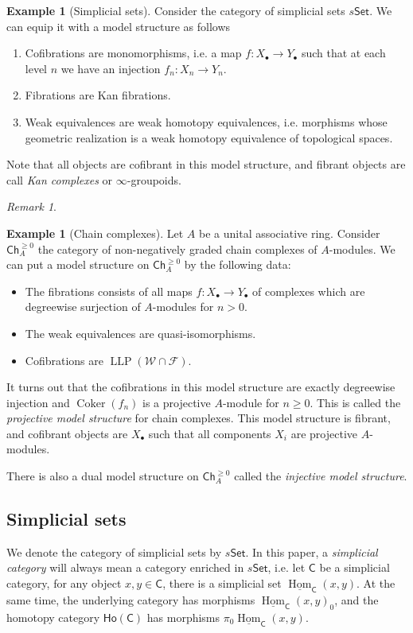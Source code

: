 \documentclass[12pt]{amsart}
\theoremstyle{definition}
\newtheorem{example}[thm]{Example}
\theoremstyle{remark}
\newtheorem{rem}[thm]{Remark}
\numberwithin{equation}{section}
\newcommand{\CC}{{\mathsf C}}
\newcommand{\1}{{\mathbb{1}}}
\newcommand{\set}{\mathsf{Set}}
\newcommand{\ho}{\mathsf{Ho}}
\newcommand{\Ch}{\mathsf{Ch}}
\newcommand{\bt}{\bullet}
\newcommand{\HOM}{\underline{\operatorname{Hom}}}
\newcommand{\coker}{{\operatorname{Coker}}}
\newcommand{\LLP}{\operatorname{LLP}}
\begin{document}
\begin{example}[Simplicial sets]
    Consider the category of simplicial sets $s\set$. We can equip it with a model structure as follows
    \begin{enumerate}
        \item Cofibrations are monomorphisms, i.e. a map $f:X_{\bt}\to Y_{\bt}$ such that at each level $n$ we have an injection $f_n:X_n\to Y_n$.
        \item Fibrations are Kan fibrations.
        \item Weak equivalences are weak homotopy equivalences, i.e. morphisms whose geometric realization is a weak homotopy equivalence of topological spaces.
    \end{enumerate}
    
    Note that all objects are cofibrant in this model structure, and fibrant objects are call {\it Kan complexes} or $\infty$-groupoids.
\end{example}
\begin{rem}
    
\end{rem}
\begin{example}[Chain complexes]
    Let $A$ be a unital associative ring. Consider $\Ch^{\ge 0}_A$ the category of non-negatively graded chain complexes of $A$-modules. We can put a model structure on $\Ch^{\ge 0}_A$ by the following data:
    \begin{itemize}
        \item The fibrations consists of all maps $f:X_{\bt} \to Y_{\bt}$ of complexes which are degreewise surjection of $A$-modules for $n > 0$.
        \item The weak equivalences are quasi-isomorphisms.
        \item Cofibrations are $\LLP(\mathcal{W}\cap\mathcal{F})$.
    \end{itemize}
    It turns out that the cofibrations in this model structure are exactly degreewise injection and $\coker(f_n)$ is a projective $A$-module for $n\ge 0$. This is called the {\it projective model structure} for chain complexes. This model structure is fibrant, and cofibrant objects are $X_{\bt}$ such that all components $X_i$ are projective $A$-modules.
    
    There is also a dual model structure on $\Ch^{\ge 0}_A$ called the {\it injective model structure}.
\end{example}
\subsection{Simplicial sets}
    We denote the category of simplicial sets by $s\set$. In this paper, a {\it simplicial category} will always mean a category enriched in $s\set$, i.e. let $\CC$ be a simplicial category, for any object $x, y\in \CC$, there is a simplicial set $\HOM_{\CC}(x,y)$. At the same time, the underlying category has morphisms $\HOM_{\CC}(x,y)_0$, and the homotopy category $\ho(\CC)$ has morphisms $\pi_0 \HOM_{\CC}(x,y)$.
    
\end{document}
